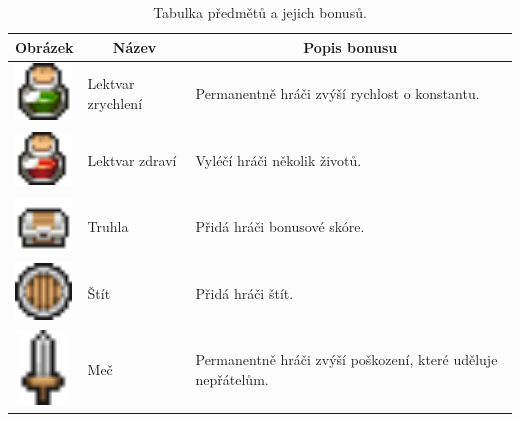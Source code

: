 \begin{table}[htbp]
    \centering
    \begin{tabular}{|m{2cm}|m{2cm}|m{8cm}|}
    \hline
    \multicolumn{1}{|c|}{\textbf{Obrázek}} & \multicolumn{1}{c|}{\textbf{Název}} & \multicolumn{1}{c|}{\textbf{Popis bonusu}} \\
    \hline
    \hline
    \centering\includegraphics[width=1.5cm,height=1.5cm]{obrazky-figures/ch3/green_potion.png} & Lektvar zrychlení & Permanentně hráči zvýší rychlost o konstantu. \\
    \hline
    \centering\includegraphics[width=1.5cm,height=1.5cm]{obrazky-figures/ch3/red_potion.png} & Lektvar zdraví & Vyléčí hráči několik životů. \\
    \hline
    \centering\includegraphics[width=1.5cm,height=1.5cm]{obrazky-figures/ch3/chests.png} & Truhla & Přidá hráči bonusové skóre. \\
    \hline
    \centering\includegraphics[width=1.5cm,height=1.5cm]{obrazky-figures/ch3/shield.png} & Štít & Přidá hráči štít. \\
    \hline
    \centering\includegraphics[width=1.5cm,height=2cm]{obrazky-figures/ch3/sword.png} & Meč & Permanentně hráči zvýší poškození, které uděluje nepřátelům.\\
    \hline
    \end{tabular}
    \caption{Tabulka předmětů a jejich bonusů.}
    \label{tab:přeměty}
\end{table}

